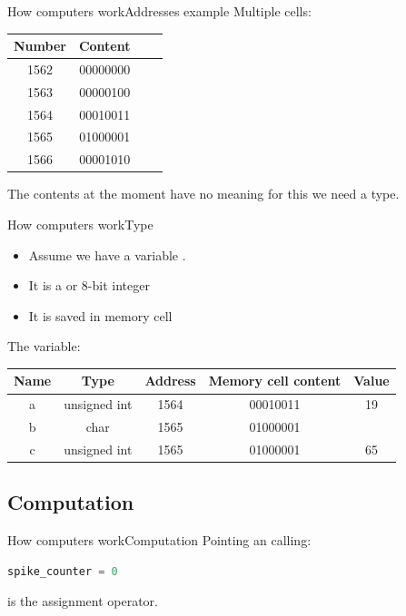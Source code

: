\documentclass[aspectratio=169]{beamer}
\begin{document}
\begin{frame}{How computers work}{Addresses example}
Multiple cells:
\begin{tabular}{cccc}
	\toprule
	Number & Content  \\
	\midrule
	1562   & 00000000 \\
	1563   & 00000100 \\
	1564   & 00010011 \\
	1565   & 01000001 \\
	1566   & 00001010 \\
	\bottomrule
\end{tabular}

\pause
\vspace{2em}

The contents at the moment have no meaning for this we need a type.

\end{frame}

\begin{frame}{How computers work}{Type}

\begin{itemize}
	\item Assume we have a variable .
	\item It is a  or 8-bit integer
	\item It is saved in memory cell 
\end{itemize}

\pause
\vspace{2em}

The variable:
\begin{tabular}{ccccc}
	\toprule
	Name & Type          & Address  & Memory cell content & Value         \\
	\midrule
	a    & unsigned int  & 1564     &  00010011           & 19            \\
	b    & char          & 1565     &  01000001           & \textquote{A} \\
	c    & unsigned int  & 1565     &  01000001           & 65            \\
	\bottomrule
\end{tabular}
\end{frame}

\subsection{Computation}
\begin{frame}[fragile]{How computers work}{Computation}
Pointing an calling:
\vspace{2em}

\begin{lstlisting}[language=Python, frame=single]
spike_counter = 0
\end{lstlisting}

\pause
\vspace{2em}
\pause

\vspace{2em}
\textquote{=} is the assignment operator.
\end{frame}
\end{document}

